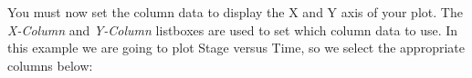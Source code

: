 \documentclass{manual}
\begin{document}
\begin{figure}[ht]
  \centerline{}
  \label{fig:winsetpath1}
\end{figure}

\pagebreak

You must now set the column data to display the X and Y axis of your plot.  The \emph{X-Column}
and \emph{Y-Column} listboxes are used to set which column data to use.  In this example we are
going to plot Stage versus Time, so we select the appropriate columns below:
\end{document}
